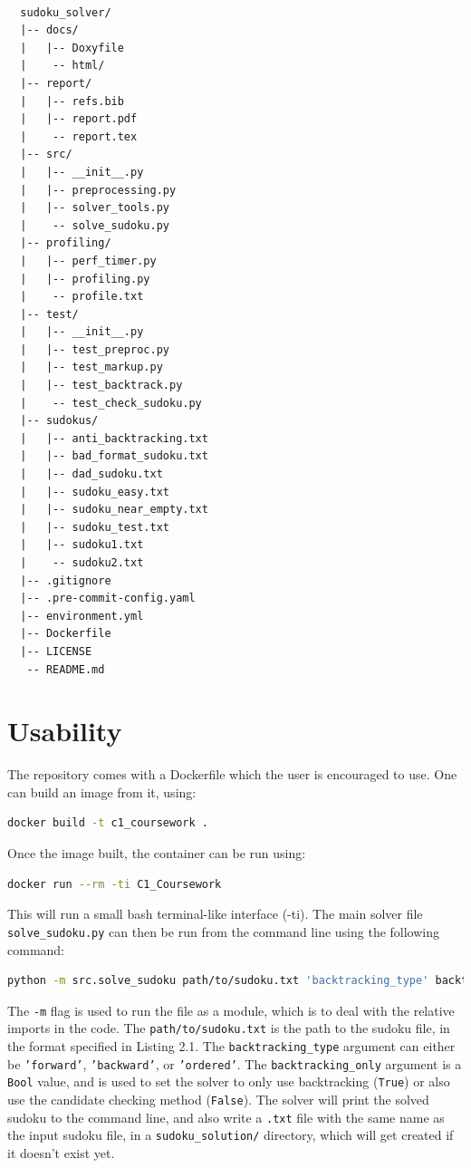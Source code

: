 \documentclass[12pt]{report} %
\begin{document}
\begin{lstlisting}[caption={Directory Structure},basicstyle=\tiny]

  sudoku_solver/
  |-- docs/
  |   |-- Doxyfile
  |    -- html/
  |-- report/
  |   |-- refs.bib
  |   |-- report.pdf
  |    -- report.tex
  |-- src/
  |   |-- __init__.py
  |   |-- preprocessing.py
  |   |-- solver_tools.py
  |    -- solve_sudoku.py
  |-- profiling/
  |   |-- perf_timer.py
  |   |-- profiling.py
  |    -- profile.txt
  |-- test/
  |   |-- __init__.py
  |   |-- test_preproc.py
  |   |-- test_markup.py
  |   |-- test_backtrack.py
  |    -- test_check_sudoku.py
  |-- sudokus/
  |   |-- anti_backtracking.txt
  |   |-- bad_format_sudoku.txt
  |   |-- dad_sudoku.txt
  |   |-- sudoku_easy.txt
  |   |-- sudoku_near_empty.txt
  |   |-- sudoku_test.txt
  |   |-- sudoku1.txt
  |    -- sudoku2.txt
  |-- .gitignore
  |-- .pre-commit-config.yaml
  |-- environment.yml
  |-- Dockerfile
  |-- LICENSE
   -- README.md

\end{lstlisting}

\section{Usability}

The repository comes with a Dockerfile which the user is encouraged to use. One can build an image from it, using:

\begin{lstlisting}[language=bash, caption={How to build the Docker image}]
  docker build -t c1_coursework .
\end{lstlisting}

Once the image built, the container can be run using:

\begin{lstlisting}[language=bash, caption={How to run the Docker container}]
  docker run --rm -ti C1_Coursework
\end{lstlisting}

This will run a small bash terminal-like interface (-ti). The main solver file \texttt{solve\_sudoku.py} can then be run from the command line using the following command:

\begin{lstlisting}[language=bash, caption={How to run the solver}]
  python -m src.solve_sudoku path/to/sudoku.txt 'backtracking_type' backtracking_only
\end{lstlisting}

The \texttt{-m} flag is used to run the file as a module, which is to deal with the relative imports in the code. The \texttt{path/to/sudoku.txt} is the path to the sudoku file, in the format specified in Listing 2.1. The \texttt{backtracking\_type} argument can either be \texttt{'forward'}, \texttt{'backward'}, or \texttt{'ordered'}. The \texttt{backtracking\_only} argument is a \texttt{Bool} value, and is used to set the solver to only use backtracking (\texttt{True}) or also use the candidate checking method (\texttt{False}). The solver will print the solved sudoku to the command line, and also write a \texttt{.txt} file with the same name as the input sudoku file, in a \texttt{sudoku\_solution/} directory, which will get created if it doesn't exist yet.
\end{document}
